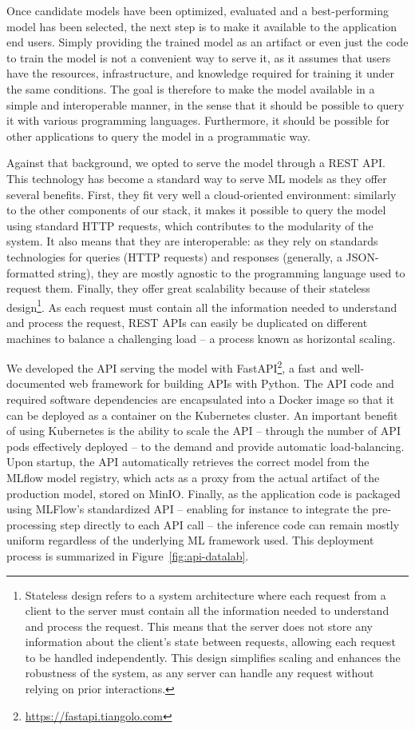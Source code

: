 \documentclass[graybox]{svmult}
\begin{document}
Once candidate models have been optimized, evaluated and a best-performing model has been selected, the next step is to make it available to the application end users. Simply providing the trained model as an artifact or even just the code to train the model is not a convenient way to serve it, as it assumes that users have the resources, infrastructure, and knowledge required for training it under the same conditions. The goal is therefore to make the model available in a simple and interoperable manner, in the sense that it should be possible to query it with various programming languages. Furthermore, it should be possible for other applications to query the model in a programmatic way. 

Against that background, we opted to serve the model through a REST API. This technology has become a standard way to serve ML models as they offer several benefits. First, they fit very well a cloud-oriented environment: similarly to the other components of our stack, it makes it possible to query the model using standard HTTP requests, which contributes to the modularity of the system. It also means that they are interoperable: as they rely on standards technologies for queries (HTTP requests) and responses (generally, a JSON-formatted string), they are mostly agnostic to the programming language used to request them. Finally, they offer great scalability because of their stateless design\footnote{Stateless design refers to a system architecture where each request from a client to the server must contain all the information needed to understand and process the request. This means that the server does not store any information about the client's state between requests, allowing each request to be handled independently. This design simplifies scaling and enhances the robustness of the system, as any server can handle any request without relying on prior interactions.}. As each request must contain all the information needed to understand and process the request, REST APIs can easily be duplicated on different machines to balance a challenging load -- a process known as horizontal scaling.

We developed the API serving the model with FastAPI\footnote{\url{https://fastapi.tiangolo.com}}, a fast and well-documented web framework for building APIs with Python. The API code and required software dependencies are encapsulated into a Docker image so that it can be deployed as a container on the Kubernetes cluster. An important benefit of using Kubernetes is the ability to scale the API -- through the number of API pods effectively deployed -- to the demand and provide automatic load-balancing. Upon startup, the API automatically retrieves the correct model from the MLflow model registry, which acts as a proxy from the actual artifact of the production model, stored on MinIO. Finally, as the application code is packaged using MLFlow's standardized API -- enabling for instance to integrate the pre-processing step directly to each API call -- the inference code can remain mostly uniform regardless of the underlying ML framework used. This deployment process is summarized in Figure~\ref{fig:api-datalab}.
\end{document}
